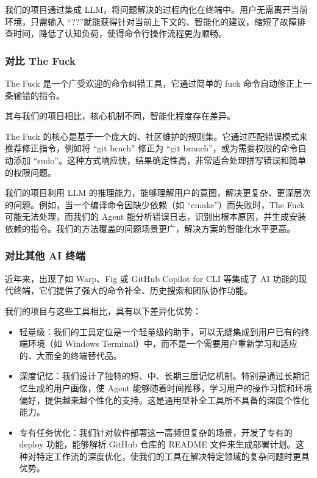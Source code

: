 \documentclass{article}
\theoremstyle{plain}
\theoremstyle{definition}
\theoremstyle{remark}
\begin{document}
我们的项目通过集成 LLM，将问题解决的过程内化在终端中。用户无需离开当前环境，只需输入 “??”就能获得针对当前上下文的、智能化的建议，缩短了故障排查时间，降低了认知负荷，使得命令行操作流程更为顺畅。

\subsubsection{对比 The Fuck}

The Fuck 是一个广受欢迎的命令纠错工具，它通过简单的 fuck 命令自动修正上一条输错的指令。

其与我们的项目相比，核心机制不同，智能化程度存在差异。

The Fuck 的核心是基于一个庞大的、社区维护的规则集。它通过匹配错误模式来推荐修正指令，例如将 “git brnch” 修正为 “git branch”，或为需要权限的命令自动添加 “sudo”。这种方式响应快，结果确定性高，非常适合处理拼写错误和简单的权限问题。

我们的项目利用 LLM 的推理能力，能够理解用户的意图，解决更复杂、更深层次的问题。例如，当一个编译命令因缺少依赖（如 “cmake”）而失败时，The Fuck 可能无法处理，而我们的 Agent 能分析错误日志，识别出根本原因，并生成安装依赖的指令。我们的方法覆盖的问题场景更广，解决方案的智能化水平更高。

\subsubsection{对比其他 AI 终端}

近年来，出现了如 Warp、Fig 或 GitHub Copilot for CLI 等集成了 AI 功能的现代终端，它们提供了强大的命令补全、历史搜索和团队协作功能。

我们的项目与这些工具相比，具有以下差异化优势：

\begin{itemize}
    \item 轻量级：我们的工具定位是一个轻量级的助手，可以无缝集成到用户已有的终端环境（如 Windows Terminal）中，而不是一个需要用户重新学习和适应的、大而全的终端替代品。
    \item 深度记忆：我们设计了独特的短、中、长期三层记忆机制。特别是通过长期记忆生成的用户画像，使 Agent 能够随着时间推移，学习用户的操作习惯和环境偏好，提供越来越个性化的支持。这是通用型补全工具所不具备的深度个性化能力。
    \item 专有任务优化：我们针对软件部署这一高频但复杂的场景，开发了专有的 deploy 功能，能够解析 GitHub 仓库的 README 文件来生成部署计划。这种对特定工作流的深度优化，使我们的工具在解决特定领域的复杂问题时更具优势。
\end{itemize}
\end{document}
